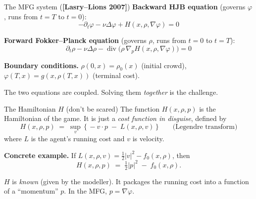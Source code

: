 \documentclass[10pt,aspectratio=169]{beamer}
\newcommand{\Div}{\operatorname{div}}
\newcommand{\blue}[1]{\textcolor{kaustblue}{#1}}
\newcommand{\citehl}[1]{\textcolor{kaustblue!80!black}{\textbf{[#1]}}}
\begin{document}
\begin{frame}{The MFG system (\citehl{Lasry--Lions 2007})}
\textbf{Backward HJB equation} (governs $\varphi$, runs from $t=T$ to $t=0$):
\[
  -\partial_t\varphi - \nu\Delta\varphi + H(x, \rho, \nabla\varphi) = 0
\]

\textbf{Forward Fokker--Planck equation} (governs $\rho$, runs from $t=0$ to $t=T$):
\[
  \partial_t\rho - \nu\Delta\rho - \Div\!\bigl(\rho\,\nabla_p H(x, \rho, \nabla\varphi)\bigr) = 0
\]

\smallskip
\textbf{Boundary conditions.}
$\rho(0,x) = \rho_0(x)$ \;(initial crowd), \;
$\varphi(T,x) = g(x, \rho(T,x))$ \;(terminal cost).

\vspace{0.3cm}
\begin{center}
\end{center}

\smallskip
The two equations are \alert{coupled}.  Solving them \emph{together} is the challenge.
\end{frame}

\begin{frame}{The Hamiltonian $H$ \;\textnormal{\small(don't be scared)}}
The function $H(x, \rho, p)$ is the \blue{Hamiltonian} of the game.
It is just a \emph{cost function in disguise}, defined by
\[
  H(x, \rho, p) \;=\; \sup_{v}\,\bigl\{\,-v\!\cdot\!p \;-\; L(x, \rho, v)\,\bigr\}
  \qquad \text{(Legendre transform)}
\]
where $L$ is the agent's running cost and $v$ is velocity.

\medskip
\textbf{Concrete example.} If $L(x,\rho,v) = \tfrac12|v|^2 - f_0(x,\rho)$, then
\[
  H(x,\rho,p) \;=\; \tfrac12|p|^2 \;-\; f_0(x,\rho).
\]

\medskip
\begin{recap}[title=What you must remember]
$H$ is \emph{known} (given by the modeller).
It packages the running cost into a function of a ``momentum'' $p$.
In the MFG, $p = \nabla\varphi$.
\end{recap}
\end{frame}
\end{document}

